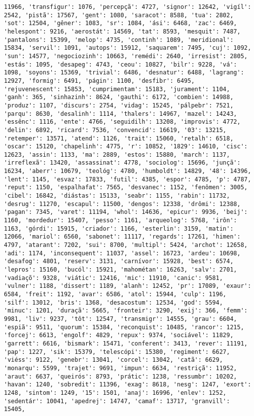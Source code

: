 \documentclass[11pt]{article}
\begin{document}
\begin{Verbatim}[commandchars=\\\{\}]
11966, 'transfigur': 1076, 'percepçã': 4727, 'signor': 12642, 'vigíl': 2542, 'pistã': 17567, 'gent': 1080, 'saracot': 8588, 'tua': 2802, 'sot': 12504, 'gêner': 1083, 'sr': 1084, 'ási': 6468, 'zac': 6469, 'helespont': 9216, 'aerostát': 14569, 'tat': 8593, 'mesquit': 7487, 'pantalons': 15399, 'melop': 4735, 'continh': 1089, 'meridional': 15834, 'servil': 1091, 'autops': 15912, 'saquarem': 7495, 'cuj': 1092, 'sun': 14577, 'negociozinh': 10663, 'remédi': 2640, 'irresist': 2805, 'estás': 1095, 'desapeg': 4743, 'ceou': 10827, 'bilr': 9228, 'vá': 1098, 'soyons': 15369, 'trivial': 6486, 'desnatur': 6488, 'lagrang': 12927, 'formig': 6491, 'págin': 1100, 'desfibr': 6495, 'rejuvenescent': 15853, 'cumprimentam': 15183, 'jurament': 1104, 'ganh': 365, 'sinhazinh': 8624, 'gauthi': 6172, 'combien': 14988, 'produz': 1107, 'discurs': 2754, 'vidag': 15245, 'pálpebr': 7521, 'parqu': 8630, 'desalinh': 1114, 'thalers': 14967, 'mazel': 14243, 'essênc': 1116, 'ente': 4766, 'seguidilh': 13208, 'improvis': 4772, 'delin': 6892, 'ricard': 7536, 'convencid': 16619, '03': 13215, 'retemper': 13571, 'atend': 1126, 'trait': 15060, 'retalh': 6518, 'oscar': 15120, 'chapelinh': 4775, 'r': 10852, '1829': 14610, 'cisc': 12623, 'assin': 1133, 'ma': 2889, 'estos': 15880, 'march': 1137, 'irreflexã': 13420, 'assassinat': 4778, 'sociolog': 15696, 'junçã': 16234, 'aberr': 10679, 'teológ': 4780, 'humboldt': 14829, '48': 14396, 'lent': 1145, 'esvaz': 17833, 'futil': 4385, 'espor': 4785, 'p': 4787, 'reput': 1150, 'espalhafat': 7565, 'desvanec': 1152, 'fenômen': 3005, 'cibel': 16842, 'diástas': 15133, 'seabr': 1155, 'rabin': 11732, 'desrug': 11270, 'escapul': 11500, 'dengos': 12338, 'drômi': 12388, 'pagan': 7345, 'varet': 11194, 'whol': 14636, 'epicur': 9936, 'beij': 1160, 'mordedur': 15407, 'pesso': 1161, 'arqueolog': 5768, 'irôn': 1163, 'górdi': 15915, 'criador': 1166, 'esterlin': 3159, 'matin': 12066, 'mariol': 6560, 'sabonet': 11117, 'regards': 17261, 'himen': 4797, 'atarant': 7202, 'sui': 8700, 'multipl': 5424, 'archot': 12658, 'adi': 1174, 'inconsequent': 11037, 'assel': 16723, 'ardeu': 10698, 'desafog': 4801, 'reserv': 3131, 'carnívor': 15928, 'best': 6574, 'lepros': 15160, 'bucól': 15921, 'mahométan': 16263, 'salv': 2701, 'vadiaçõ': 9328, 'viátic': 12416, 'mic': 11910, 'canic': 9581, 'vulner': 1188, 'dissert': 1189, 'alanh': 12452, 'pr': 17089, 'exaur': 6584, 'freit': 1192, 'avar': 6586, 'atol': 15944, 'culp': 1196, 'silf': 13012, 'bris': 1368, 'desacostum': 12534, 'god': 5594, 'minuc': 1201, 'duraçã': 5665, 'fronteir': 3290, 'exij': 366, 'femm': 9981, 'liv': 9237, 'tôt': 12547, 'transmigr': 14555, 'grau': 6604, 'espiã': 9511, 'quorum': 15384, 'reconquist': 10485, 'rancor': 1215, 'forcej': 6613, 'engolf': 4829, 'repux': 9374, 'sociável': 11829, 'garrett': 6616, 'bismark': 15471, 'conferent': 3413, 'rever': 11191, 'pap': 1227, 'sik': 15379, 'telescópi': 15380, 'regiment': 6627, 'viéss': 9122, 'genebr': 13041, 'corcel': 13042, 'catã': 6629, 'monarqu': 5599, 'trajet': 9691, 'impun': 6634, 'restriçã': 11952, 'araut': 6637, 'queirós': 8793, 'prátic': 1238, 'ressumbr': 10202, 'havan': 1240, 'sobredit': 11396, 'exag': 8618, 'nesg': 1247, 'exort': 1248, 'sintom': 1249, '15': 1501, 'anaj': 16996, 'enlev': 1252, 'sedentár': 10041, 'apedrej': 14747, 'camaf': 13717, 'granvill': 15405, 
\end{Verbatim}
\end{document}
